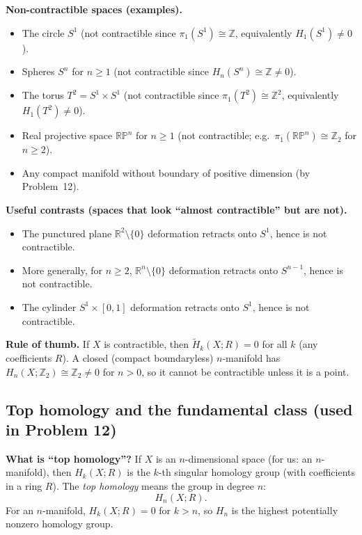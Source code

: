 \documentclass[12pt,a4paper]{article}
\theoremstyle{plain}
\theoremstyle{definition}      %
\begin{document}
\medskip
\noindent\textbf{Non-contractible spaces (examples).}
\begin{itemize}
	\item The circle $S^1$ (not contractible since $\pi_1(S^1)\cong\mathbb{Z}$, equivalently $H_1(S^1)\neq 0$).
	\item Spheres $S^n$ for $n\ge 1$ (not contractible since $H_n(S^n)\cong\mathbb{Z}\neq 0$).
	\item The torus $T^2=S^1\times S^1$ (not contractible since $\pi_1(T^2)\cong\mathbb{Z}^2$,
	equivalently $H_1(T^2)\neq 0$).
	\item Real projective space $\mathbb{RP}^n$ for $n\ge 1$
	(not contractible; e.g.\ $\pi_1(\mathbb{RP}^n)\cong \mathbb{Z}_2$ for $n\ge 2$).
	\item Any compact manifold without boundary of positive dimension (by Problem~12).
\end{itemize}

\medskip
\noindent\textbf{Useful contrasts (spaces that look ``almost contractible'' but are not).}
\begin{itemize}
	\item The punctured plane $\mathbb{R}^2\setminus\{0\}$ deformation retracts onto $S^1$,
	hence is not contractible.
	\item More generally, for $n\ge 2$, $\mathbb{R}^n\setminus\{0\}$ deformation retracts onto $S^{n-1}$,
	hence is not contractible.
	\item The cylinder $S^1\times[0,1]$ deformation retracts onto $S^1$, hence is not contractible.
\end{itemize}

\medskip
\noindent\textbf{Rule of thumb.}
If $X$ is contractible, then $\widetilde H_k(X;R)=0$ for all $k$ (any coefficients $R$).
A closed (compact boundaryless) $n$-manifold has $H_n(X;\mathbb{Z}_2)\cong \mathbb{Z}_2\neq 0$ for $n>0$,
so it cannot be contractible unless it is a point.

\subsection*{Top homology and the fundamental class (used in Problem 12)}

\noindent\textbf{What is ``top homology''?}
If $X$ is an $n$-dimensional space (for us: an $n$-manifold), then $H_k(X;R)$ is the $k$-th singular homology group
(with coefficients in a ring $R$). The \emph{top homology} means the group in degree $n$:
\[
H_n(X;R).
\]
For an $n$-manifold, $H_k(X;R)=0$ for $k>n$, so $H_n$ is the highest potentially nonzero homology group.
\end{document}
